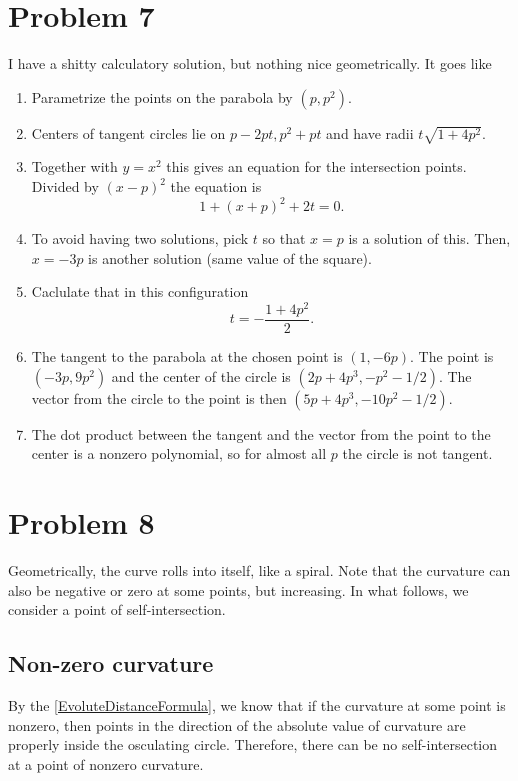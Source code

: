 \section{Problem 7}
I have a shitty calculatory solution, but nothing nice geometrically. It goes like
\begin{enumerate}
    \item Parametrize the points on the parabola by \( (p, p^2) \).
    \item Centers of tangent circles lie on \( p - 2pt, p^2 + pt \) and have radii \( t\sqrt{1 + 4p^2} \).
    \item Together with \( y = x^2 \) this gives an equation for the intersection points. Divided by \( (x - p)^2 \) the equation is
        \[
        1 + (x+p)^2 + 2t = 0.
        \]
    \item To avoid having two solutions, pick \(t\) so that \( x = p \) is a solution of this. Then, \( x = -3p \) is another solution (same value of the square).
    \item Caclulate that in this configuration
        \[
            t = -\frac{1+4p^2}{2}.
        \]
\item The tangent to the parabola at the chosen point is \( (1, -6p) \). The point is \( (-3p, 9p^2) \) and the center of the circle is \( (2p + 4p^3, -p^2 - 1/2) \). The vector from the circle to the point is then \((5p + 4p^3, -10p^2 -1/2) \).
\item The dot product between the tangent and the vector from the point to the center is a nonzero polynomial, so for almost all \( p \) the circle is not tangent.

\end{enumerate}

\section{Problem 8}

Geometrically, the curve rolls into itself, like a spiral. Note that the curvature can also be negative or zero at some points, but increasing. In what follows, we consider a point of self-intersection.
\subsection{Non-zero curvature}
By the \ref{EvoluteDistanceFormula}, we know that if the curvature at some point is nonzero, then points in the direction of the absolute value of curvature are properly inside the osculating circle. Therefore, there can be no self-intersection at a point of nonzero curvature.

